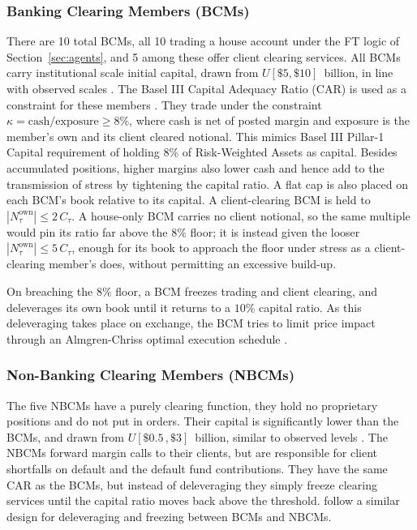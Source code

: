 \subsubsection{Banking Clearing Members (BCMs)}

There are 10 total BCMs, all 10 trading a house account under the FT logic of Section~\ref{sec:agents}, and 5 among these offer client clearing services. All BCMs carry institutional scale initial capital, drawn from  $U[\$5,\$10]$\ billion, in line with observed scales \citep{cftc_fcm}. The Basel III Capital Adequacy Ratio (CAR) is used as a constraint for these members \citep{haynes_mcphail_zhu_2019,acosta_smith_2018}. They trade under the constraint  $\kappa = \mathrm{cash}/\mathrm{exposure} \ge 8\%$, where cash is net of posted margin and exposure is the member's own and its client cleared notional. This mimics Basel III Pillar-1 Capital requirement of holding 8\% of Risk-Weighted Assets as capital. Besides accumulated positions, higher margins also lower cash and hence add to the transmission of stress by tightening the capital ratio. A flat cap is also placed on each BCM's book relative to its capital.  A client-clearing BCM is held to $|N^{\mathrm{own}}_\tau| \le 2\,C_\tau$. A house-only
BCM carries no client notional, so the same multiple would pin its ratio far above the $8\%$ floor; it is instead given the looser $|N^{\mathrm{own}}_\tau| \le 5\,C_\tau$, enough for its
book to approach the floor under stress as a client-clearing member's does, without permitting an
excessive build-up. 

On breaching the $8\%$ floor, a BCM freezes trading and client clearing, and deleverages its own book until it returns to a $10\%$ capital ratio. As this deleveraging takes place on exchange, the BCM tries to limit price impact through an Almgren-Chriss optimal execution schedule \citep{almgren_chriss_2000}. 

\subsubsection{Non-Banking Clearing Members (NBCMs)}

The five NBCMs have a purely clearing function, they hold no proprietary positions and do not put in orders. Their capital is significantly lower than the BCMs, and drawn from $U[\$0.5\,,\$3]$\ billion, similar to observed levels  \citep{cftc_fcm}. The NBCMs forward margin calls to their clients, but are responsible for client shortfalls on default and the default fund contributions. They have the same CAR as the BCMs, but instead of deleveraging they simply freeze clearing services until the capital ratio moves back above the threshold. \cite{deloitte_ccp} follow a similar design for deleveraging and freezing between BCMs and NBCMs. 

